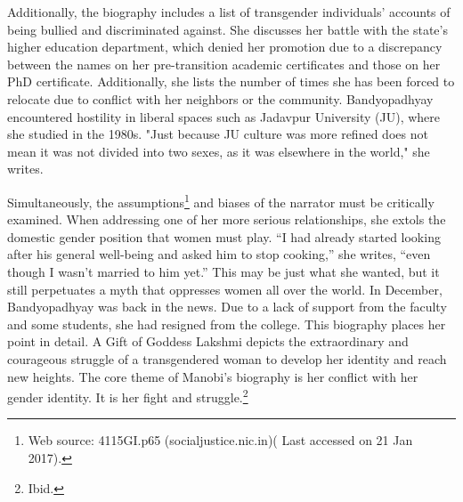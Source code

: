 \begin{multicols}{2}
\noi
Additionally, the biography includes a list of transgender individuals' accounts of being bullied
and discriminated against. She discusses her battle with the state's higher education department,
which denied her promotion due to a discrepancy between the names on her pre-transition
academic certificates and those on her PhD certificate. Additionally, she lists the number of
times she has been forced to relocate due to conflict with her neighbors or the community.
Bandyopadhyay encountered hostility in liberal spaces such as Jadavpur University (JU), where
she studied in the 1980s. "Just because JU culture was more refined does not mean it was not
divided into two sexes, as it was elsewhere in the world," she writes.


\noi
Simultaneously, the assumptions\footnote{Web source: 4115GI.p65 (socialjustice.nic.in)( Last accessed on 21 Jan 2017).} and biases of the narrator must be critically examined. When addressing one of her more serious relationships, she extols the domestic gender position that women must play. “I had already started looking after his general well-being and asked him to stop cooking,” she writes, “even though I wasn't married to him yet.” This may be just what she wanted, but it still perpetuates a myth that oppresses women all over the world. In December, Bandyopadhyay was back in the news. Due to a lack of support from the faculty and some students, she had resigned from the college. This biography places her point in detail. A Gift of Goddess Lakshmi depicts the extraordinary and courageous struggle of a
transgendered woman to develop her identity and reach new heights. The core theme of
Manobi's biography is her conflict with her gender identity. It is her fight and struggle.\footnote{Ibid.}

\end{multicols}
	
\label{end2017-art4}
